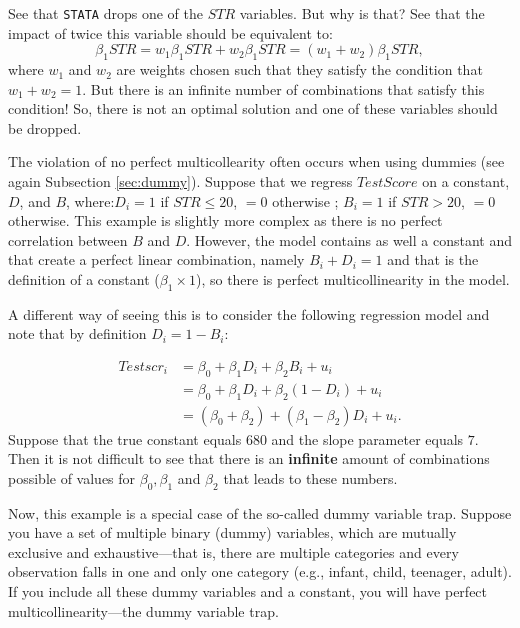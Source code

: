 \documentclass[
]{book}
\begin{document}
See that \texttt{STATA} drops one of the \(STR\) variables. But why is that? See that the impact of twice this variable should be equivalent to:
\begin{equation}
\beta_1 STR = w_1 \beta_1 STR + w_2 \beta_1 STR = (w_1 + w_2) \beta_1 STR , 
\end{equation}
where \(w_1\) and \(w_2\) are weights chosen such that they satisfy the condition that \(w_1 + w_2 = 1\). But there is an infinite number of combinations that satisfy this condition! So, there is not an optimal solution and one of these variables should be dropped.

The violation of no perfect multicollearity often occurs when using dummies (see again Subsection \ref{sec:dummy}). Suppose that we regress \(TestScore\) on a constant, \(D\), and \(B\), where:\(D_i =1\) if \(STR \leq 20\), \(=0\) otherwise ; \(B_i =1\) if \(STR>20\), \(= 0\) otherwise. This example is slightly more complex as there is no perfect correlation between \(B\) and \(D\). However, the model contains as well a constant and that create a perfect linear combination, namely \(B_i + D_i = 1\) and that is the definition of a constant (\(\beta_1 \times 1\)), so there is perfect multicollinearity in the model.

A different way of seeing this is to consider the following regression model and note that by definition \(D_i = 1- B_i\):

\begin{align}
Testscr_i &= \beta_0 + \beta_1 D_i + \beta_2 B_i + u_i\\
          &= \beta_0 + \beta_1 D_i + \beta_2 (1 - D_i) + u_i\\
          &= (\beta_0 + \beta_2) + (\beta_1 - \beta_2) D_i + u_i.
\end{align}
Suppose that the true constant equals \(680\) and the slope parameter equals \(7\). Then it is not difficult to see that there is an \textbf{infinite} amount of combinations possible of values for \(\beta_0, \beta_1\) and \(\beta_2\) that leads to these numbers.

Now, this example is a special case of the so-called dummy variable trap. Suppose you have a set of multiple binary (dummy) variables, which are mutually exclusive and exhaustive---that is, there are multiple categories and every observation falls in one and only one category (e.g., infant, child, teenager, adult). If you include all these dummy variables and a constant, you will have perfect multicollinearity---the dummy variable trap.
\end{document}
